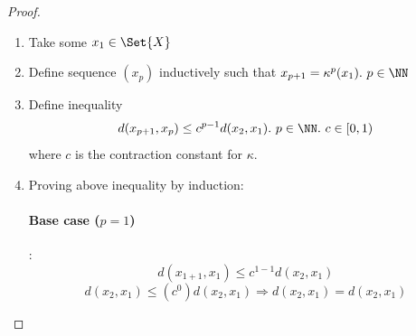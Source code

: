 \begin{proof}\ 
  \begin{enumerate}
  \item Take some $x_1 \in \Set{X}$
  \item Define sequence $(x_p)$ inductively such that $x_{p+1} = \kappa^p(x_1).\ p \in \NN$
  \item Define inequality
    \begin{equation}
      \label{l8e0}
      d(x_{p+1}, x_p) \leq c^{p-1}d(x_2, x_1).\ p \in \NN.\ c \in [0, 1)
    \end{equation}
    where $c$ is the contraction constant for $\kappa$. 
  \item Proving above inequality by induction:
    \paragraph{Base case ($p=1$)}:
    $$d(x_{1+1}, x_1) \leq c^{1-1}d(x_2, x_1)$$
    $$d(x_2, x_1) \leq (c^0)d(x_2, x_1) \Rightarrow d(x_2, x_1) = d(x_2, x_1)$$

\end{enumerate}
\end{proof}
